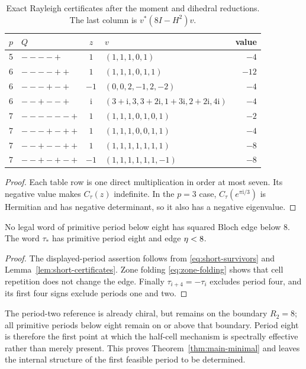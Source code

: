 \begin{table}[t]
\centering
\caption{Exact Rayleigh certificates after the moment and dihedral
reductions.  The last column is $v^*(8I-H^2)v$.}
\label{tab:certificates}
\scriptsize
\begin{tabularx}{\textwidth}{@{}c l c >{\raggedright\arraybackslash}X r@{}}
\toprule
$p$&$Q$&$z$&$v$&value\\ \midrule
5&$----+$&$1$&$(1,1,1,0,1)$&$-4$\\
6&$----++$&$1$&$(1,1,1,0,1,1)$&$-12$\\
6&$---+-+$&$-1$&$(0,0,2,-1,2,-2)$&$-4$\\
6&$--+--+$&$\mathrm i$&$(3+\mathrm i,3,3+2\mathrm i,1+3\mathrm i,
2+2\mathrm i,4\mathrm i)$&$-4$\\
7&$------+$&$1$&$(1,1,1,0,1,0,1)$&$-2$\\
7&$---+-++$&$1$&$(1,1,1,0,0,1,1)$&$-4$\\
7&$--+--++$&$1$&$(1,1,1,1,1,1,1)$&$-8$\\
7&$--+-+-+$&$-1$&$(1,1,1,1,1,1,-1)$&$-8$\\ \bottomrule
\end{tabularx}
\end{table}

\begin{proof}
Each table row is one direct multiplication in order at most seven.  Its
negative value makes $C_\tau(z)$ indefinite.  In the $p=3$ case,
$C_\tau(e^{\pi\mathrm i/3})$ is Hermitian and has negative determinant, so it
also has a negative eigenvalue.
\end{proof}

\begin{theorem}
\label{thm:minimal-period}
No legal word of primitive period below eight has squared Bloch edge below
$8$.  The word $\tau_*$ has primitive period eight and edge $\eta<8$.
\end{theorem}

\begin{proof}
The displayed-period assertion follows from
\eqref{eq:short-survivors} and Lemma~\ref{lem:short-certificates}.
Zone folding \eqref{eq:zone-folding} shows that cell repetition does not
change the edge.  Finally $\tau_{i+4}=-\tau_i$ excludes period four, and its
first four signs exclude periods one and two.
\end{proof}

The period-two reference is already chiral, but remains on the boundary
$R_2=8$; all primitive periods below eight remain on or above that boundary.
Period eight is therefore the first point at which the half-cell mechanism is
spectrally effective rather than merely present.  This proves
Theorem~\ref{thm:main-minimal} and leaves the internal structure of the first
feasible period to be determined.

